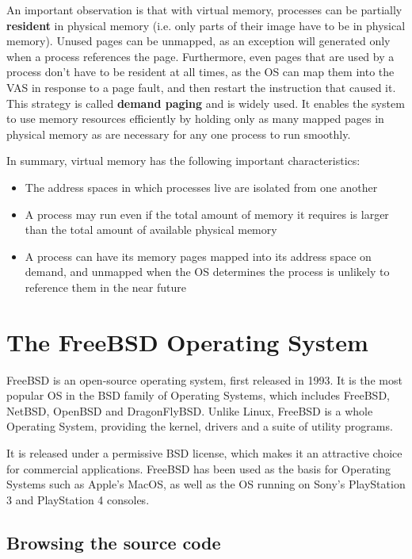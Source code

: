 \documentclass[shortabstract, english]{iithesis}
\begin{document}
An important observation is that with virtual memory, processes can be partially
\textbf{resident} in physical memory (i.e. only parts of their image have to be
in physical memory). Unused pages can be unmapped, as an exception will
generated only when a process references the page. Furthermore, even pages that
are used by a process don't have to be resident at all times, as the OS can map
them into the VAS in response to a page fault, and then restart the
instruction that caused it. This strategy is called \textbf{demand paging} and
is widely used. It enables the system to use memory resources efficiently
by holding only as many mapped pages in physical memory as are necessary for
any one process to run smoothly.

In summary, virtual memory has the following important characteristics:
\begin{itemize}
\item The address spaces in which processes live are isolated from one another
\item A process may run even if the total amount of memory it requires is larger
  than the total amount of available physical memory
\item A process can have its memory pages mapped into its address space on
  demand, and unmapped when the OS determines the process is unlikely to
  reference them in the near future
\end{itemize}

\section{The FreeBSD Operating System}

FreeBSD is an open-source operating system, first released in 1993. It is the
most popular OS in the BSD family of Operating Systems, which includes FreeBSD,
NetBSD, OpenBSD and DragonFlyBSD. Unlike Linux, FreeBSD is a whole Operating
System, providing the kernel, drivers and a suite of utility programs.

It is released under a permissive BSD license, which makes it an attractive
choice for commercial applications. FreeBSD has been used as the basis for
Operating Systems such as Apple's MacOS, as well as the OS running on Sony's
PlayStation 3 and PlayStation 4 consoles.

\subsection{Browsing the source code}
\end{document}
